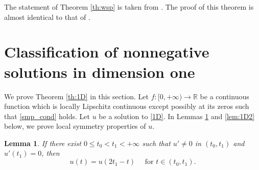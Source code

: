 \documentclass[reqno]{amsart}
\theoremstyle{plain}
\newtheorem{lemma}[theorem]{Lemma}
\theoremstyle{definition}
\theoremstyle{remark}
\begin{document}
	The statement of Theorem \ref{th:wsp} is taken from \cite{MR3058211}. The proof of this theorem is almost identical to that of \cite[Lemma 2.7]{MR1955278}.
	
	\section{Classification of nonnegative solutions in dimension one}\label{sect3}
	We prove Theorem \ref{th:1D} in this section.
	Let $f:[0,+\infty) \to \mathbb{R}$ be a continuous function which is locally Lipschitz continuous except possibly at its zeros such that \eqref{smp_cond} holds. Let $u$ be a solution to \eqref{1D}. In Lemmas \ref{lem:1D1} and \ref{lem:1D2} below, we prove local symmetry properties of $u$.	
	\begin{lemma}\label{lem:1D1}
		If there exist $0\le t_0<t_1<+\infty$ such that $u' \ne 0$ in $(t_0, t_1)$ and $u'(t_1)=0$, then
		\[
		u(t) = u(2t_1-t) \quad\text{ for } t\in(t_0, t_1).
		\]
	\end{lemma}
\end{document}
